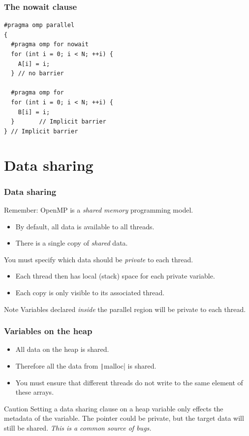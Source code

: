 \documentclass[aspectratio=169]{beamer}
\begin{document}
\begin{frame}[fragile]
\frametitle{The nowait clause}
\begin{verbatim}
#pragma omp parallel
{
  #pragma omp for nowait
  for (int i = 0; i < N; ++i) {
    A[i] = i;
  } // no barrier

  #pragma omp for
  for (int i = 0; i < N; ++i) {
    B[i] = i;
  }       // Implicit barrier
} // Implicit barrier
\end{verbatim}
\end{frame}


\section{Data sharing}
\begin{frame}
\frametitle{Data sharing}
Remember: OpenMP is a \emph{shared memory} programming model.
\begin{itemize}
  \item By default, all data is available to all threads.
  \item There is a single copy of \emph{shared} data.
\end{itemize}

\vfill

You must specify which data should be \emph{private} to each thread.
\begin{itemize}
  \item Each thread then has local (stack) space for each private variable.
  \item Each copy is only visible to its associated thread.
\end{itemize}

\begin{block}{Note}
Variables declared \emph{inside} the parallel region will be private to each thread.
\end{block}

\end{frame}


\begin{frame}
\frametitle{Variables on the heap}
\begin{itemize}
  \item All data on the heap is shared.
  \item Therefore all the data from \texttt|malloc| is shared.
  \item You must ensure that different threads do not write to the same element of these arrays.
\end{itemize}

\begin{alertblock}{Caution}
Setting a data sharing clause on a heap variable only effects the metadata of the variable.
The pointer could be private, but the target data will still be shared.
\textit{This is a common source of bugs.}
\end{alertblock}
\end{frame}
\end{document}
